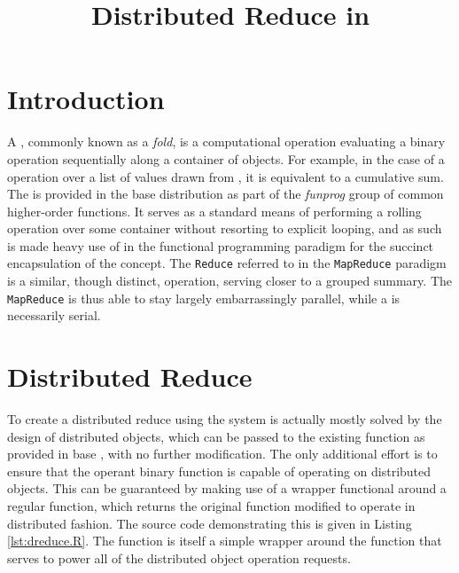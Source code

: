 \documentclass[10pt, a4paper]{article}
\begin{document}
\title{Distributed Reduce in \lsr{}}
  
\maketitle
\section{Introduction} %

A , commonly known as a \textit{fold}, is a computational operation evaluating a binary operation sequentially along a container of objects\cite{bird2010pearls}.
For example, in the case of a \hsrc{+} operation over a list of values drawn from \tbb, it is equivalent to a cumulative sum.
The  is provided in the base \R{} distribution as part of the \textit{funprog} group of common higher-order functions.
It serves as a standard means of performing a rolling operation over some container without resorting to explicit looping, and as such is made heavy use of in the functional programming paradigm for the succinct encapsulation of the concept.
The \texttt{Reduce} referred to in the \texttt{MapReduce} paradigm is a similar, though distinct, operation, serving closer to a grouped summary\cite{dean2004mapreduce}.
The \texttt{MapReduce} is thus able to stay largely embarrassingly parallel, while a  is necessarily serial.

\section{Distributed Reduce}

To create a distributed reduce using the \lsr{} system is actually mostly solved by the design of distributed objects, which can be passed to the existing  function as provided in base \R{}, with no further modification.
The only additional effort is to ensure that the operant binary function is capable of operating on distributed objects.
This can be guaranteed by making use of a  wrapper functional around a regular function, which returns the original function modified to operate in distributed fashion. 
The source code demonstrating this is given in Listing \ref{lst:dreduce.R}.
The  function is itself a simple wrapper around the  function that serves to power all of the \lsr{} distributed object operation requests.
\end{document}

